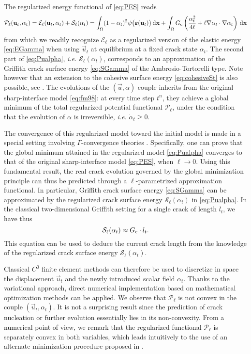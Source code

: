 The regularized energy functional of \eqref{eq:PES} reads
\begin{equation} \label{eq:Pualpha}
\mathcal{P}_\ell(\vec{u}_t,\alpha_t)=\mathcal{E}_\ell(\vec{u}_t,\alpha_t)+\mathcal{S}_\ell(\alpha_t)=\int_\Omega(1-\alpha_t)^2\psi\bigl(\eps(\vec{u}_t)\bigr)\dx+\int_\Omega\gc\left(\frac{\alpha_t^2}{4\ell}+\ell\nabla\alpha_t\cdot\nabla\alpha_t\right)\dx
\end{equation}
from which we readily recognize $\mathcal{E}_\ell$ as a regularized version of the elastic energy \eqref{eq:EGamma} when using $\vec{u}_t$ at equilibrium at a fixed crack state $\alpha_t$. The second part of \eqref{eq:Pualpha}, \emph{i.e.} $\mathcal{S}_\ell(\alpha_t)$, corresponds to an approximation of the Griffith crack surface energy \eqref{eq:SGamma} of the Ambrosio-Tortorelli type. Note however that an extension to the cohesive surface energy \eqref{eq:cohesiveSt} is also possible, see \cite{ContiFocardiIurlano:2015}. The evolutions of the $(\vec{u},\alpha)$ couple inherits from the original sharp-interface model \eqref{eq:fm98}: at every time step $t^n$, they achieve a global minimum of the total regularized potential functional $\mathcal{P}_\ell$, under the condition that the evolution of $\alpha$ is irreversible, \emph{i.e.} $\dot{\alpha}_t\geq 0$.

The convergence of this regularized model toward the initial model is made in a special setting involving $\Gamma$-convergence theories \cite{Braides:2002}. Specifically, one can prove that the global minimum attained in the regularized model \eqref{eq:Pualpha} converges to that of the original sharp-interface model \eqref{eq:PES}, when $\ell\to 0$. Using this fundamental result, the real crack evolution governed by the global minimization principle can thus be predicted through a $\ell$-parametrized approximation functional. In particular, Griffith crack surface energy \eqref{eq:SGamma} can be approximated by the regularized crack surface energy $\mathcal{S}_\ell(\alpha_t)$ in \eqref{eq:Pualpha}. In the classical two-dimensional Griffith setting for a single crack of length $l_t$, we have thus
\begin{equation} \label{eq:Selllt}
\mathcal{S}_\ell(\alpha_t)\approx G_\mathrm{c}\cdot l_t.
\end{equation}
This equation can be used to deduce the current crack length from the knowledge of the regularized crack surface energy $\mathcal{S}_\ell(\alpha_t)$.

Classical $C^0$ finite element methods can therefore be used to discretize in space the displacement $\vec{u}_t$ and the newly introduced scalar field $\alpha_t$. Thanks to the variational approach, direct numerical implementation based on mathematical optimization methods can be applied. We observe that $\mathcal{P}_\ell$ is not convex in the couple $(\vec{u}_t,\alpha_t)$. It is not a surprising result since the prediction of crack nucleation or further evolution essentially lies in its non-convexity. From a numerical point of view, we remark that the regularized functional $\mathcal{P}_\ell$ is separately convex in both variables, which leads intuitively to the use of an alternate minimization procedure proposed in \cite{BourdinFrancfortMarigo:2000}.

